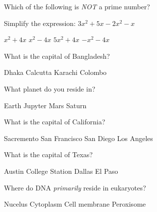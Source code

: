 \documentclass[12pt]{exam}
\begin{document}
    \begin{questions}
        \question Which of the following is \textit{NOT} a prime number? 
            \begin{oneparchoices}
            \end{oneparchoices}
        
        \question Simplify the expression: $3x^2 + 5x - 2x^2 - x$   
        \begin{oneparchoices}
            \CorrectChoice $x^2 + 4x$  
            \choice $x^2 - 4x$
            \choice $5x^2 + 4x$
            \choice $-x^2 - 4x$
        \end{oneparchoices} 

        \question What is the capital of Bangladesh?   
        \begin{oneparchoices}
            \CorrectChoice Dhaka  
            \choice Calcutta
            \choice Karachi
            \choice Colombo
        \end{oneparchoices} 

        \question What planet do you reside in?   
        \begin{oneparchoices}
            \CorrectChoice Earth  
            \choice Jupyter
            \choice Mars
            \choice Saturn
        \end{oneparchoices} 

        \question What is the capital of California?   
        \begin{oneparchoices}
            \CorrectChoice Sacremento  
            \choice San Francisco
            \choice San Diego
            \choice Los Angeles
        \end{oneparchoices} 

        \question What is the capital of Texas?   
        \begin{oneparchoices}
            \CorrectChoice Austin
            \choice College Station
            \choice Dallas
            \choice El Paso
        \end{oneparchoices} 

        \question Where do DNA \textit{primarily} reside in eukaryotes?   
        \begin{oneparchoices}
            \CorrectChoice Nucelus
            \choice Cytoplasm
            \choice Cell membrane
            \choice Peroxisome
        \end{oneparchoices} 


\end{questions}
\end{document}
